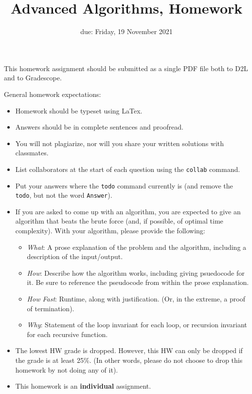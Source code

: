 \documentclass{article}
\title{Advanced Algorithms, Homework \hwnum}
\author{\todo{Your Name Here}}
\date{due: Friday, 19 November 2021}
\begin{document}
\maketitle

This homework assignment should be
submitted as a single PDF file both to D2L and to Gradescope.

General homework expectations:
\begin{itemize}
    \item Homework should be typeset using LaTex.
    \item Answers should be in complete sentences and proofread.
    \item You will not plagiarize, nor will you share your written solutions
        with classmates.
    \item List collaborators at the start of each question using the
        \texttt{collab} command.
    \item Put your answers where the \texttt{todo} command currently is (and
        remove the \texttt{todo}, but not the word \texttt{Answer}).
    \item If you are asked to come up with an algorithm, you are
        expected to give an algorithm that beats the brute force (and, if possible, of
        optimal time complexity). With your algorithm, please provide the following:
        \begin{itemize}
            \item \emph{What}: A prose explanation of the problem and the algorithm,
                including a description of the input/output.
            \item \emph{How}: Describe how the algorithm works, including giving
                psuedocode for it.  Be sure to reference the pseudocode
                from within the prose explanation.
            \item \emph{How Fast}: Runtime, along with justification.  (Or, in the
                extreme, a proof of termination).
            \item \emph{Why}: Statement of the loop invariant for each loop, or
                recursion invariant for each recursive function.
        \end{itemize}
    \item The lowest HW grade is dropped.  However, this HW can only be dropped
        if the grade is at least 25\%.  (In other words, please do not choose to
        drop this homework by not doing any of it).
    \item This homework is an \textbf{individual} assignment.
\end{itemize}
\end{document}
